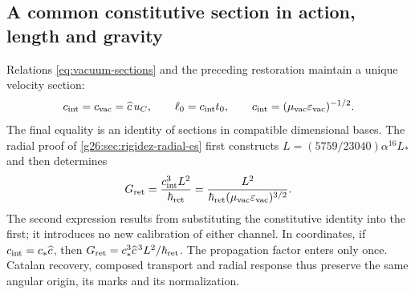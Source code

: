 \subsection{A common constitutive section in action, length and gravity}
\label{cr28:sec:constitutive-radial} Relations \eqref{eq:vacuum-sections} and the preceding restoration maintain a unique velocity section:
\begin{equation}
 c_{\rm int}=c_{\rm vac}=\widehat c\,u_C,\qquad
 \ell_0=c_{\rm int}t_0,\qquad
 c_{\rm int}=(\mu_{\rm vac}\varepsilon_{\rm vac})^{-1/2}.
 \label{cr28:eq:same-velocity}
\end{equation}
The final equality is an identity of sections in compatible dimensional bases. The radial proof of \cref{g26:sec:rigidez-radial-es} first constructs \(L=(5759/23040)\alpha^{16}L_*\) and then determines
\begin{equation}
 G_{\rm ret}=\frac{c_{\rm int}^3L^2}{\hbar_{\rm ret}}
 =\frac{L^2}
 {\hbar_{\rm ret}(\mu_{\rm vac}\varepsilon_{\rm vac})^{3/2}}.
 \label{cr28:eq:constitutive-gravity}
\end{equation}
The second expression results from substituting the constitutive identity into the first; it introduces no new calibration of either channel. In coordinates, if \(c_{\rm int}=c_*\widehat c\), then \(G_{\rm ret}=c_*^3\widehat c^{\,3}L^2/\hbar_{\rm ret}\). The propagation factor enters only once. Catalan recovery, composed transport and radial response thus preserve the same angular origin, its marks and its normalization.

